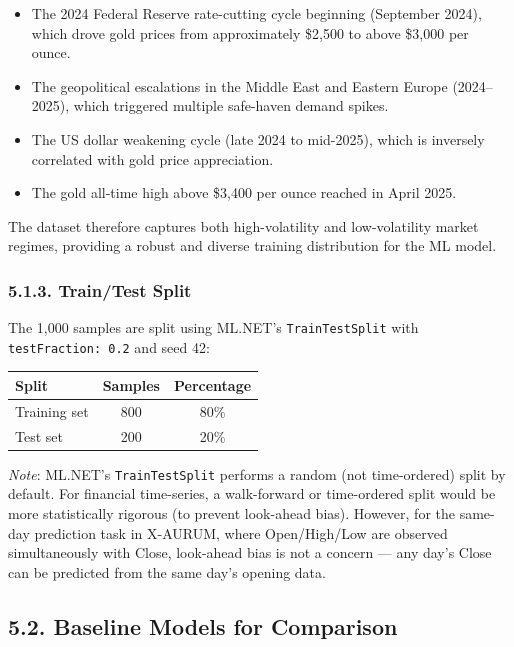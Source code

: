 \begin{itemize}
  \item The 2024 Federal Reserve rate-cutting cycle beginning (September 2024), which drove gold prices from approximately \$2,500 to above \$3,000 per ounce.
  \item The geopolitical escalations in the Middle East and Eastern Europe (2024--2025), which triggered multiple safe-haven demand spikes.
  \item The US dollar weakening cycle (late 2024 to mid-2025), which is inversely correlated with gold price appreciation.
  \item The gold all-time high above \$3,400 per ounce reached in April 2025.
\end{itemize}

The dataset therefore captures both high-volatility and low-volatility market regimes, providing a robust and diverse training distribution for the ML model.

\subsubsection{5.1.3. Train/Test Split}
The 1,000 samples are split using ML.NET's \texttt{TrainTestSplit} with \texttt{testFraction: 0.2} and seed 42:

\begin{center}
\begin{tabular}{|l|c|c|}
\hline
\textbf{Split} & \textbf{Samples} & \textbf{Percentage}\\
\hline
Training set & 800 & 80\%\\
Test set & 200 & 20\%\\
\hline
\end{tabular}
\end{center}

\textit{Note}: ML.NET's \texttt{TrainTestSplit} performs a random (not time-ordered) split by default. For financial time-series, a walk-forward or time-ordered split would be more statistically rigorous (to prevent look-ahead bias). However, for the same-day prediction task in X-AURUM, where Open/High/Low are observed simultaneously with Close, look-ahead bias is not a concern --- any day's Close can be predicted from the same day's opening data.

\subsection{5.2. Baseline Models for Comparison}

